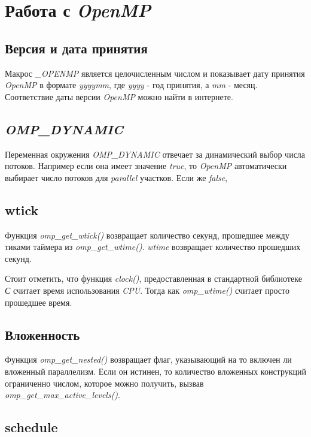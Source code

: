 \section{Работа с \textit{OpenMP}}

\subsection{Версия и дата принятия}

Макрос \textit{\_OPENMP} является целочисленным числом и показывает дату принятия \textit{OpenMP} в формате \textit{yyyymm}, где \textit{yyyy} - год принятия, а \textit{mm} - месяц.
Соответствие даты версии \textit{OpenMP} можно найти в интернете.

\subsection{\textit{OMP\_DYNAMIC}}

Переменная окружения \textit{OMP\_DYNAMIC} отвечает за динамический выбор числа потоков. Например если она имеет значение \textit{true}, то \textit{OpenMP} автоматически выбирает число потоков для \textit{parallel} участков.
Если же \textit{false},

\subsection{wtick}

Функция \textit{omp\_get\_wtick()} возвращает количество секунд, прошедшее между тиками таймера из \textit{omp\_get\_wtime()}.
\textit{wtime} возвращает количество прошедших секунд.

Стоит отметить, что функция \textit{clock()}, предоставленная в стандартной библиотеке \textit{С} считает время использования \textit{CPU}.
Тогда как \textit{omp\_wtime()} считает просто прошедшее время. 

\subsection{Вложенность}

Функция \textit{omp\_get\_nested()} возвращает флаг, указывающий на то включен ли вложенный параллелизм.
Если он истинен, то количество вложенных конструкций ограниченно числом, которое можно получить, вызвав \textit{omp\_get\_max\_active\_levels()}.

\subsection{schedule}

